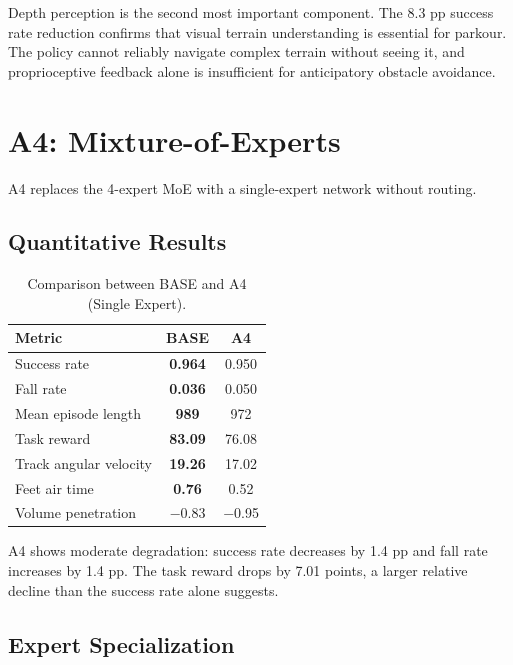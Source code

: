 Depth perception is the second most important component. The 8.3 pp success rate reduction confirms that visual terrain understanding is essential for parkour. The policy cannot reliably navigate complex terrain without seeing it, and proprioceptive feedback alone is insufficient for anticipatory obstacle avoidance.

\section{A4: Mixture-of-Experts}
\label{sec:ablation_moe}

A4 replaces the 4-expert MoE with a single-expert network without routing.

\subsection{Quantitative Results}

\begin{table}[t]
\centering
\caption{Comparison between BASE and A4 (Single Expert).}
\label{tab:a4_results}
\begin{tabular}{lcc}
\toprule
\textbf{Metric} & \textbf{BASE} & \textbf{A4} \\
\midrule
Success rate & \textbf{0.964} & 0.950 \\
Fall rate & \textbf{0.036} & 0.050 \\
Mean episode length & \textbf{989} & 972 \\
Task reward & \textbf{83.09} & 76.08 \\
Track angular velocity & \textbf{19.26} & 17.02 \\
Feet air time & \textbf{0.76} & 0.52 \\
Volume penetration & $-$0.83 & $-$0.95 \\
\bottomrule
\end{tabular}
\end{table}

A4 shows moderate degradation: success rate decreases by 1.4 pp and fall rate increases by 1.4 pp. The task reward drops by 7.01 points, a larger relative decline than the success rate alone suggests.

\subsection{Expert Specialization}

